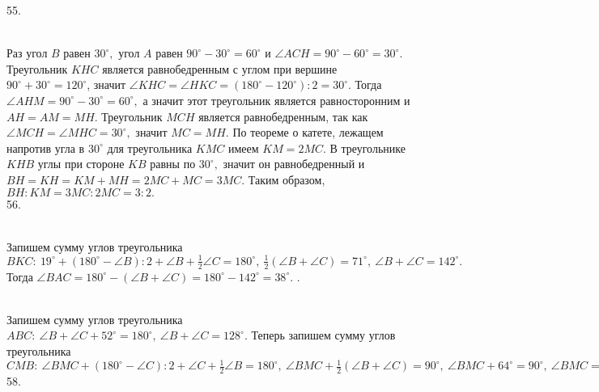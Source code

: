 55. \begin{figure}[ht!]
\end{figure}\\
Раз угол $B$ равен $30^\circ,$ угол $A$ равен $90^\circ-30^\circ=60^\circ$ и $\angle ACH=90^\circ-60^\circ=30^\circ.$  Треугольник $KHC$ является равнобедренным с углом при вершине $90^\circ+30^\circ=120^\circ$, значит $\angle KHC=\angle HKC=(180^\circ-120^\circ):2=30^\circ.$ Тогда $\angle AHM=90^\circ-30^\circ=60^\circ,$ а значит этот треугольник является равносторонним и $AH=AM=MH.$ Треугольник $MCH$ является равнобедренным, так как $\angle MCH=\angle MHC=30^\circ,$ значит $MC=MH.$  По теореме о катете, лежащем напротив угла в $30^\circ$ для треугольника $KMC$ имеем $KM=2MC.$ В треугольнике $KHB$ углы при стороне $KB$ равны по $30^\circ,$ значит он равнобедренный и  $BH=KH=KM+MH=2MC+MC=3MC.$ Таким образом, $BH:KM=3MC:2MC=3:2.$\\
56. \begin{figure}[ht!]
\end{figure}\\
Запишем сумму углов треугольника $BKC:\ 19^\circ+(180^\circ-\angle B):2+\angle B+\frac{1}{2}\angle C=180^\circ,\ \frac{1}{2}(\angle B+\angle C)=71^\circ,\ \angle B+\angle C=142^\circ.$ Тогда $\angle BAC=180^\circ-(\angle B+\angle C)=180^\circ-142^\circ=38^\circ.$\newpage
{}. \begin{figure}[ht!]
\end{figure}\\
Запишем сумму углов треугольника $ABC:\ \angle B+\angle C+52^\circ=180^\circ,\ \angle B+\angle C=128^\circ.$ Теперь запишем сумму углов треугольника $CMB:\ \angle BMC+(180^\circ-\angle C):2+\angle C+\frac{1}{2}\angle B=180^\circ,\ \angle BMC+\frac{1}{2}(\angle B+\angle C)=90^\circ,\ \angle BMC+64^\circ=90^\circ,\ \angle BMC=26^\circ.$\\
58. \begin{figure}[ht!]
\end{figure}\\
